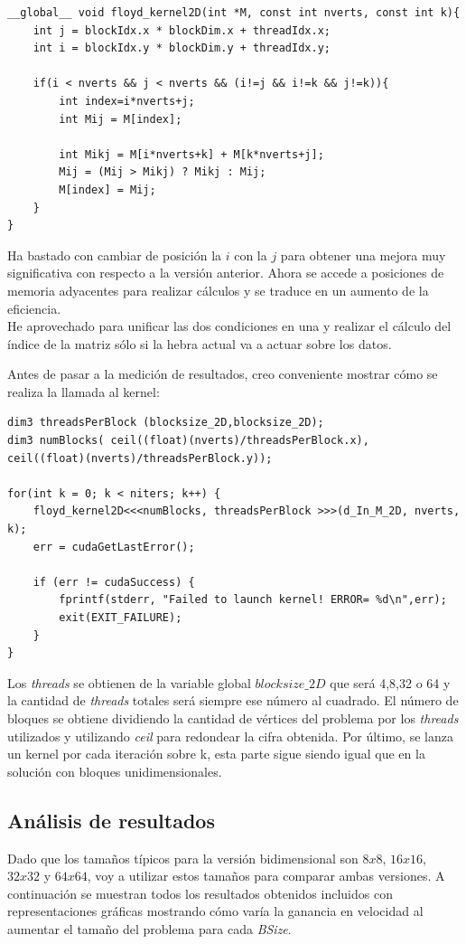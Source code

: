 \begin{verbatim}
__global__ void floyd_kernel2D(int *M, const int nverts, const int k){
	int j = blockIdx.x * blockDim.x + threadIdx.x;
	int i = blockIdx.y * blockDim.y + threadIdx.y;
	
	if(i < nverts && j < nverts && (i!=j && i!=k && j!=k)){
		int index=i*nverts+j;
		int Mij = M[index];
		
		int Mikj = M[i*nverts+k] + M[k*nverts+j];
		Mij = (Mij > Mikj) ? Mikj : Mij;
		M[index] = Mij;
	}
}
\end{verbatim}

Ha bastado con cambiar de posición la $i$ con la $j$ para obtener una mejora muy significativa con respecto a la versión anterior. Ahora se accede a posiciones de memoria adyacentes para realizar cálculos y se traduce en un aumento de la eficiencia.\\
He aprovechado para unificar las dos condiciones en una y realizar el cálculo del índice de la matriz sólo si la hebra actual va a actuar sobre los datos.

Antes de pasar a la medición de resultados, creo conveniente mostrar cómo se realiza la llamada al kernel:

\begin{verbatim}
dim3 threadsPerBlock (blocksize_2D,blocksize_2D);
dim3 numBlocks( ceil((float)(nverts)/threadsPerBlock.x),
ceil((float)(nverts)/threadsPerBlock.y));

for(int k = 0; k < niters; k++) {
	floyd_kernel2D<<<numBlocks, threadsPerBlock >>>(d_In_M_2D, nverts, k);
	err = cudaGetLastError();
	
	if (err != cudaSuccess) {
		fprintf(stderr, "Failed to launch kernel! ERROR= %d\n",err);
		exit(EXIT_FAILURE);
	}
}
\end{verbatim}

Los \textit{threads} se obtienen de la variable global $blocksize\_2D$ que será 4,8,32 o 64 y la cantidad de \textit{threads} totales será siempre ese número al cuadrado.
El número de bloques se obtiene dividiendo la cantidad de vértices del problema por los \textit{threads} utilizados y utilizando \textit{ceil} para redondear la cifra obtenida.
Por último, se lanza un kernel por cada iteración sobre k, esta parte sigue siendo igual que en la solución con bloques unidimensionales.

\subsection{Análisis de resultados}
Dado que los tamaños típicos para la versión bidimensional son $8x8$, $16x16$, $32x32$ y $64x64$, voy a utilizar estos tamaños para comparar ambas versiones. A continuación se muestran todos los resultados obtenidos incluidos con representaciones gráficas mostrando cómo varía la ganancia en velocidad al aumentar el tamaño del problema para cada \textit{BSize}.

